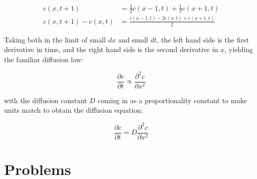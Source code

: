 \documentclass[12pt]{article}
\begin{document}
\begin{align*}
c(x, t+1) &= \frac{1}{2}c(x-1, t) + \frac{1}{2}c(x+1, t)\\
c(x, t+1) - c(x, t) &= \frac{c(x-1, t)-2c(x, t)+c(x+1, t)}{2}
\end{align*}

Taking both in the limit of small $dx$ and small $dt$, the left hand side is the first derivative in time, and the right hand side is the second derivative in $x$, yielding the familiar diffusion law:

\begin{equation*}
\frac{\partial c}{\partial t} \propto \frac{\partial^2 c}{\partial x^2}
\end{equation*}

with the diffusion constant $D$ coming in as a proportionality constant to make units match to obtain the diffusion equation:

\begin{equation*}
\frac{\partial c}{\partial t}  = D \frac{\partial^2 c}{\partial x^2}
\end{equation*}


\section{Problems}
\end{document}
